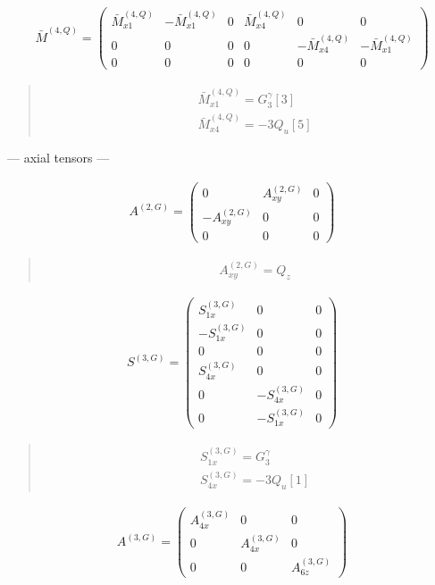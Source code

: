\documentclass[fleqn,10pt]{jsarticle}
\begin{document}
\begin{align*}
\bar{M}^{(4,Q)} = \begin{pmatrix} \bar{M}^{(4,Q)}_{x1} & - \bar{M}^{(4,Q)}_{x1} & 0 & \bar{M}^{(4,Q)}_{x4} & 0 & 0 \\ 0 & 0 & 0 & 0 & - \bar{M}^{(4,Q)}_{x4} & - \bar{M}^{(4,Q)}_{x1} \\ 0 & 0 & 0 & 0 & 0 & 0 \end{pmatrix}
\end{align*}
\begin{quote}
\begin{align*}
& \bar{M}^{(4,Q)}_{x1} = G_{3}^{\gamma}[3] \\
& \bar{M}^{(4,Q)}_{x4} = - 3 Q_{u}[5]
\end{align*}
\end{quote}
\newpage
\begin{center}\LARGE --- axial tensors ---\end{center}
\begin{align*}
A^{(2,G)} = \begin{pmatrix} 0 & A^{(2,G)}_{xy} & 0 \\ - A^{(2,G)}_{xy} & 0 & 0 \\ 0 & 0 & 0 \end{pmatrix}
\end{align*}
\begin{quote}
\begin{align*}
& A^{(2,G)}_{xy} = Q_{z}
\end{align*}
\end{quote}
\begin{align*}
S^{(3,G)} = \begin{pmatrix} S^{(3,G)}_{1x} & 0 & 0 \\ - S^{(3,G)}_{1x} & 0 & 0 \\ 0 & 0 & 0 \\ S^{(3,G)}_{4x} & 0 & 0 \\ 0 & - S^{(3,G)}_{4x} & 0 \\ 0 & - S^{(3,G)}_{1x} & 0 \end{pmatrix}
\end{align*}
\begin{quote}
\begin{align*}
& S^{(3,G)}_{1x} = G_{3}^{\gamma} \\
& S^{(3,G)}_{4x} = - 3 Q_{u}[1]
\end{align*}
\end{quote}
\begin{align*}
A^{(3,G)} = \begin{pmatrix} A^{(3,G)}_{4x} & 0 & 0 \\ 0 & A^{(3,G)}_{4x} & 0 \\ 0 & 0 & A^{(3,G)}_{6z} \end{pmatrix}
\end{align*}
\end{document}
